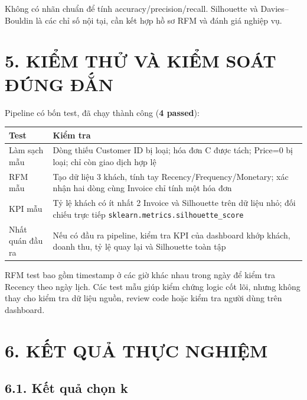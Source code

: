 \documentclass[a4paper]{article}
\begin{document}
Không có nhãn chuẩn để tính accuracy/precision/recall. Silhouette và Davies--Bouldin là các chỉ số nội tại, cần kết hợp hồ sơ RFM và đánh giá nghiệp vụ.



\section*{5. KIỂM THỬ VÀ KIỂM SOÁT ĐÚNG ĐẮN}

Pipeline có bốn test, đã chạy thành công (\textbf{4 passed}):

\begin{table}[htbp]
\centering
\small
\begin{tabularx}{\textwidth}{|>{\raggedright\arraybackslash}X|>{\raggedright\arraybackslash}X|}
\hline
\textbf{Test} & \textbf{Kiểm tra} \\
\hline
Làm sạch mẫu & Dòng thiếu Customer ID bị loại; hóa đơn C được tách; Price=0 bị loại; chỉ còn giao dịch hợp lệ \\
\hline
RFM mẫu & Tạo dữ liệu 3 khách, tính tay Recency/Frequency/Monetary; xác nhận hai dòng cùng Invoice chỉ tính một hóa đơn \\
\hline
KPI mẫu & Tỷ lệ khách có ít nhất 2 Invoice và Silhouette trên dữ liệu nhỏ; đối chiếu trực tiếp \texttt{sklearn.metrics.silhouette\_score} \\
\hline
Nhất quán đầu ra & Nếu có đầu ra pipeline, kiểm tra KPI của dashboard khớp khách, doanh thu, tỷ lệ quay lại và Silhouette toàn tập \\
\hline
\end{tabularx}
\end{table}


RFM test bao gồm timestamp ở các giờ khác nhau trong ngày để kiểm tra Recency theo ngày lịch. Các test mẫu giúp kiểm chứng logic cốt lõi, nhưng không thay cho kiểm tra dữ liệu nguồn, review code hoặc kiểm tra người dùng trên dashboard.



\section*{6. KẾT QUẢ THỰC NGHIỆM}

\subsection*{6.1. Kết quả chọn k}
\end{document}
